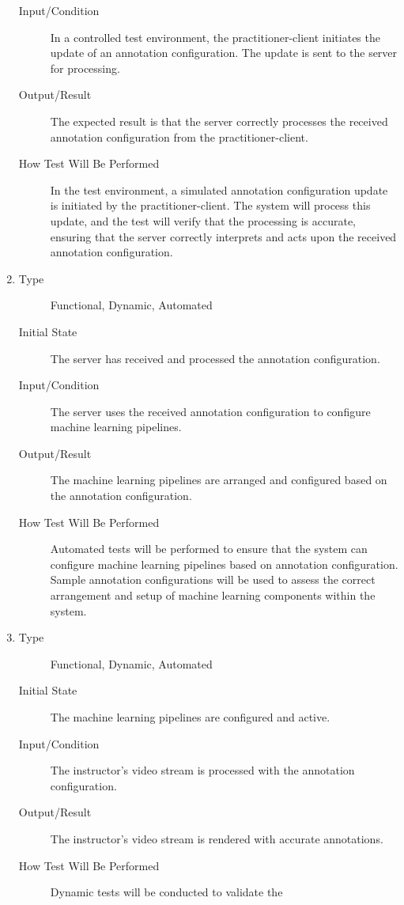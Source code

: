 \documentclass[12pt, titlepage]{article}
\begin{document}
\begin{enumerate}[FR-T1]
\begin{description}
  \item[Input/Condition] In a controlled test environment, the practitioner-client
    initiates the update of an annotation configuration. The update is sent to
    the server for processing.
  \item[Output/Result] The expected result is that the server correctly processes
    the received annotation configuration from the practitioner-client.
  \item[How Test Will Be Performed] In the test environment, a simulated annotation
    configuration update is initiated by the practitioner-client. The system
    will process this update, and the test will verify that the processing is
    accurate, ensuring that the server correctly interprets and acts upon the
    received annotation configuration.
  \end{description}
\item \label{FRT8}
  \begin{description}
  \item[Type] Functional, Dynamic, Automated
  \item[Initial State] The server has received and processed the annotation
    configuration.
  \item[Input/Condition] The server uses the received annotation configuration to
    configure machine learning pipelines.
  \item[Output/Result] The machine learning pipelines are arranged and configured
    based on the annotation configuration.
  \item[How Test Will Be Performed] Automated tests will be performed to ensure
    that the system can configure machine learning pipelines based on annotation
    configuration. Sample annotation configurations will be used to assess the
    correct arrangement and setup of machine learning components within the
    system.
  \end{description}
\item \label{FRT9}
  \begin{description}
  \item[Type] Functional, Dynamic, Automated
  \item[Initial State] The machine learning pipelines are configured and active.
  \item[Input/Condition] The instructor's video stream is processed with the
    annotation configuration.
  \item[Output/Result] The instructor's video stream is rendered with accurate
    annotations.
  \item[How Test Will Be Performed] Dynamic tests will be conducted to validate the

\end{description}
\end{enumerate}
\end{document}
